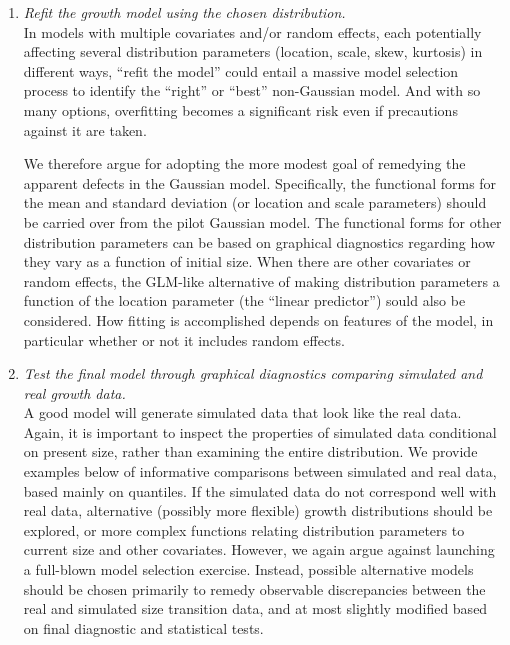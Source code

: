 \documentclass[11pt]{article}
\begin{document}
{\begin{enumerate}
\item \textit{Refit the growth model using the chosen distribution.}
\\
In models with multiple covariates and/or random effects, each potentially affecting several distribution parameters (location, scale, skew, kurtosis) in
different ways, ``refit the model'' could entail a massive model selection process to identify the ``right'' or ``best'' non-Gaussian model. 
And with so many options, overfitting becomes a significant risk even if precautions against it are taken. 

We therefore argue for adopting the more modest goal of remedying the apparent defects in the Gaussian model. Specifically, the functional forms
for the mean and standard deviation (or location and scale parameters) should be carried over from the pilot Gaussian model. The functional forms
for other distribution parameters can be based on graphical diagnostics regarding how they vary as a function of initial size. 
When there are other covariates or random effects, the GLM-like alternative of making distribution parameters a function of the location parameter (the ``linear predictor'') sould also be considered. 
How fitting is accomplished depends on features of the model, in particular whether or not it includes random effects. 

\item \textit{Test the final model through graphical diagnostics comparing simulated and real growth data.} 
\\
A good model will generate simulated data that look like the real data.  
Again, it is important to inspect the properties of simulated data conditional on present size, rather than examining the entire distribution.   
We provide examples below of informative comparisons between simulated and real data, based mainly on quantiles. 
If the simulated data do not correspond well with real data, alternative (possibly more flexible) growth distributions should be explored, or more complex
functions relating distribution parameters to current size and other covariates. 
However, we again argue against launching a full-blown model selection exercise. 
Instead, possible alternative models should be chosen primarily to remedy observable discrepancies between the real and simulated 
size transition data, and at most slightly modified based on final diagnostic and statistical tests.

\end{enumerate}

}
\end{document}
